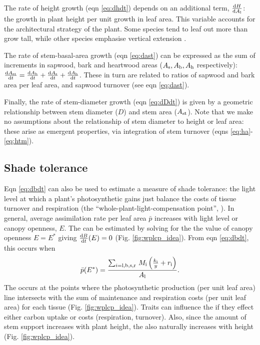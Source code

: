 \documentclass[a4paper,11pt]{article}
\begin{document}
The rate of height growth (eqn \ref{eq:dhdt}) depends on an additional term, $\frac{{\rm d}H }{{\rm d}A_{\rm l}}$: the growth in plant height per unit growth in leaf area. This variable accounts for the architectural strategy of the plant. Some species tend to leaf out more than grow tall, while other species emphasise vertical extension \citep{Poorter-2006}.

The rate of stem-basal-area growth (eqn \ref{eq:dast}) can be expressed as the sum of increments in sapwood, bark and heartwood areas ($A_{\rm s}, A_{\rm b}, A_{\rm h}$ respectively): $\frac{{\rm d}A_{\rm st}}{{\rm d}t}= \frac{{\rm d}A_{\rm b}}{{\rm d}t} + \frac{{\rm d}A_{\rm s}}{{\rm d}t} + \frac{{\rm d}A_{\rm h}}{{\rm d}t}$. These in turn are related to ratios of sapwood and bark area per leaf area, and sapwood turnover (see eqn \ref{eq:dast}).

Finally, the rate of stem-diameter growth (eqn \ref{eq:dDdt}) is given by a geometric relationship between stem diameter ($D$) and stem area ($A_{\rm st}$). Note that we make no assumptions about the relationship of stem diameter to height or leaf area: these arise as emergent properties, via integration of stem turnover (eqns \ref{eq:ha}- \ref{eq:htm}).

\subsection{Shade tolerance}

Eqn \ref{eq:dbdt} can also be used to estimate a measure of shade tolerance: the light level at which a plant's photosynthetic gains just balance the costs of tissue turnover and respiration \citep{Givnish-1988, Baltzer-2007, Lusk-2013} (the ``whole-plant-light-compensation point'', {\wplcp}). In general, average assimilation rate per leaf area $\bar{p}$ increases with light level or canopy openness, $E$. The {\wplcp} can be estimated by solving for the the value of canopy openness $E=E^*$ giving $\frac{{\rm d}B} {{\rm d}t}(E)=0$ (Fig. \ref{fig:wplcp_idea}). From eqn \ref{eq:dbdt}, this occurs when
\begin{equation}\label{eq:wplcp}
\bar{p}(E^*) =\frac{\sum_{i={\rm l,b,s,r}} \, M_{\rm i} \left(\frac{k_{\rm i}}{y} + r_{\rm i}\right)}{A_{\rm l}}.
\end{equation}
The {\wplcp} occurs at the points where the photosynthetic production (per unit leaf area) line intersects with the sum of maintenance and respiration costs (per unit leaf area) for each tissue (Fig. \ref{fig:wplcp_idea}). Traits can influence the {\wplcp} if they effect either carbon uptake or costs (respiration, turnover). Also, since the amount of stem support increases with plant height, the {\wplcp} also naturally increases with height \citep{Givnish-1988} (Fig. \ref{fig:wplcp_idea}).
\end{document}
